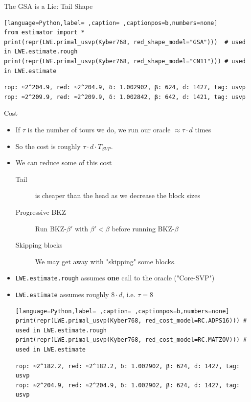 \documentclass[table,10pt,aspectratio=169]{beamer}
\begin{document}
\begin{frame}[label={sec:org405b06e},fragile]{The GSA is a Lie: Tail Shape}
 \begin{lstlisting}[language=Python,label= ,caption= ,captionpos=b,numbers=none]
from estimator import *
print(repr(LWE.primal_usvp(Kyber768, red_shape_model="GSA")))  # used in LWE.estimate.rough
print(repr(LWE.primal_usvp(Kyber768, red_shape_model="CN11"))) # used in LWE.estimate
\end{lstlisting}

\begin{verbatim}
rop: ≈2^204.9, red: ≈2^204.9, δ: 1.002902, β: 624, d: 1427, tag: usvp
rop: ≈2^209.9, red: ≈2^209.9, δ: 1.002842, β: 642, d: 1421, tag: usvp
\end{verbatim}
\end{frame}

\begin{frame}[label={sec:orgf1712a0},fragile]{Cost}
 \begin{itemize}
\item If \(\tau\)  is the number of tours we do, we run our oracle \(\approx \tau \cdot d\) times
\item So the cost is roughly \(\tau \cdot d \cdot T_{SVP}\).
\item We can reduce some of this cost
\begin{description}
\item[{Tail}] is cheaper than the head as we decrease the block sizes
\item[{Progressive BKZ}] Run BKZ-\(\beta'\) with \(\beta' < \beta\) before running BKZ-\(\beta\)
\item[{Skipping blocks}] We may get away with "skipping" some blocks.
\end{description}
\item \texttt{LWE.estimate.rough} assumes \textbf{one} call to the oracle ("Core-SVP")
\item \texttt{LWE.estimate} assumes roughly \(8 \cdot d\), i.e. \(\tau = 8\)

\begin{lstlisting}[language=Python,label= ,caption= ,captionpos=b,numbers=none]
print(repr(LWE.primal_usvp(Kyber768, red_cost_model=RC.ADPS16))) # used in LWE.estimate.rough
print(repr(LWE.primal_usvp(Kyber768, red_cost_model=RC.MATZOV))) # used in LWE.estimate
\end{lstlisting}

\begin{verbatim}
rop: ≈2^182.2, red: ≈2^182.2, δ: 1.002902, β: 624, d: 1427, tag: usvp
rop: ≈2^204.9, red: ≈2^204.9, δ: 1.002902, β: 624, d: 1427, tag: usvp
\end{verbatim}
\end{itemize}
\end{frame}
\end{document}
